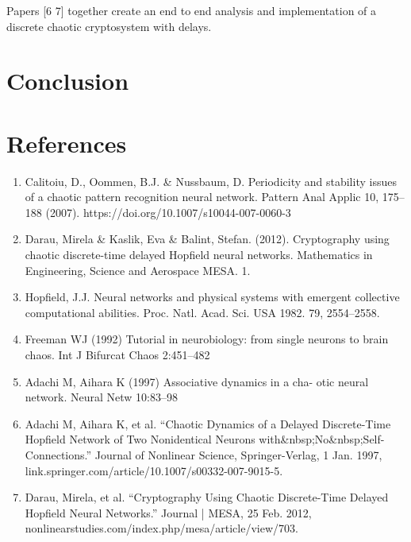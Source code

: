 \documentclass[12pt, letterpaper]{article}
\begin{document}
Papers [6 7] together create an end to end analysis and implementation of a discrete chaotic cryptosystem with delays. 


\section*{Conclusion}


\section*{References}

\fontsize{8}{12}\selectfont

\begin{enumerate}[leftmargin=*]
    \item Calitoiu, D., Oommen, B.J. \& Nussbaum, D. Periodicity and stability issues of a chaotic pattern recognition neural network. Pattern Anal Applic 10, 175–188 (2007). https://doi.org/10.1007/s10044-007-0060-3
    \item Darau, Mirela \& Kaslik, Eva \& Balint, Stefan. (2012). Cryptography using chaotic discrete-time delayed Hopfield neural networks. Mathematics in Engineering, Science and Aerospace MESA. 1.
    \item Hopfield, J.J. Neural networks and physical systems with emergent collective computational abilities.
    Proc. Natl. Acad. Sci. USA 1982. 79, 2554–2558.
    \item Freeman WJ (1992) Tutorial in neurobiology: from single neurons to brain chaos. Int J Bifurcat Chaos 2:451–482
    \item Adachi M, Aihara K (1997) Associative dynamics in a cha- otic neural network. Neural Netw 10:83–98
    \item Adachi M, Aihara K, et al. “Chaotic Dynamics of a Delayed Discrete-Time Hopfield Network of Two Nonidentical Neurons with&nbsp;No&nbsp;Self-Connections.” Journal of Nonlinear Science, Springer-Verlag, 1 Jan. 1997, link.springer.com/article/10.1007/s00332-007-9015-5. 
    \item Darau, Mirela, et al. “Cryptography Using Chaotic Discrete-Time Delayed Hopfield Neural Networks.” Journal | MESA, 25 Feb. 2012, nonlinearstudies.com/index.php/mesa/article/view/703. 
\end{enumerate}
\end{document}
